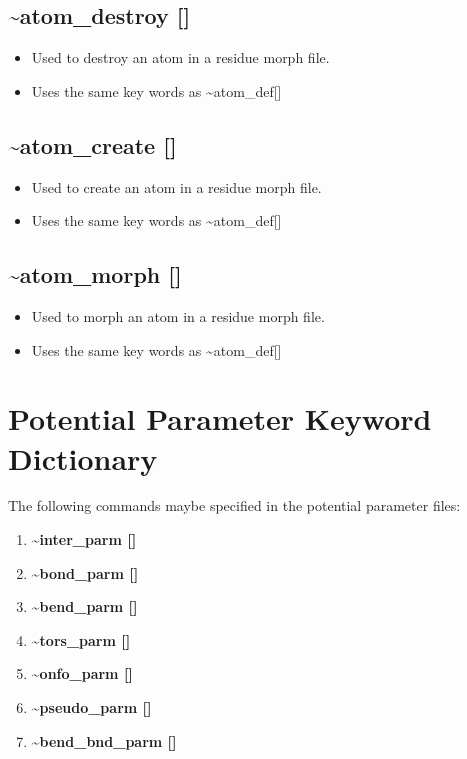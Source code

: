 \documentclass[12pt,titlepage]{article}
\begin{document}

\subsection*{\bf \~{ }atom\_destroy []}
\begin{itemize}
   \item Used to destroy an atom in a residue morph file.
   \item Uses the same key words as \~{ }atom\_def[]
\end{itemize}


\subsection*{\bf \~{ }atom\_create []}
\begin{itemize}
   \item Used to create an atom in a residue morph file.
   \item Uses the same key words as \~{ }atom\_def[]
\end{itemize}


\subsection*{\bf \~{ }atom\_morph []}
\begin{itemize}
   \item Used to morph an atom in a residue morph file.
   \item Uses the same key words as \~{ }atom\_def[]
\end{itemize}

\newpage


\section{\bf Potential Parameter Keyword Dictionary} 

The following commands maybe specified in the potential parameter files:
\begin{enumerate}
\item {\bf \~{ }inter\_parm []}
\item {\bf \~{ }bond\_parm []}
\item {\bf \~{ }bend\_parm []}
\item {\bf \~{ }tors\_parm []}
\item {\bf \~{ }onfo\_parm []}
\item {\bf \~{ }pseudo\_parm []}
\item {\bf \~{ }bend\_bnd\_parm []}
\end{enumerate}
\end{document}
